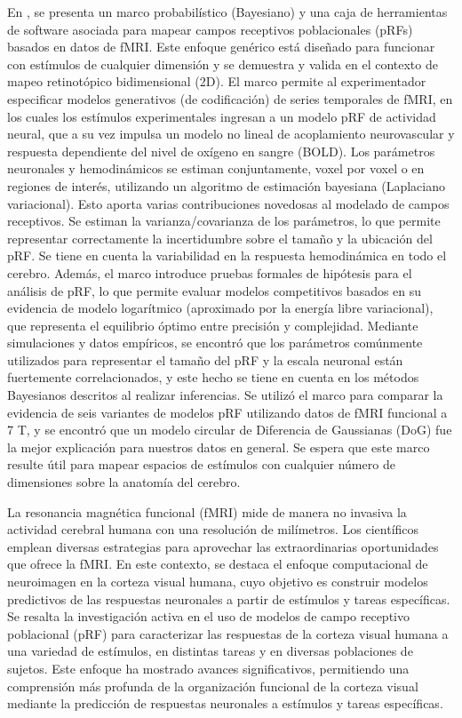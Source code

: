 En \cite{zeidman_bayesian_2018}, se presenta un marco probabilístico (Bayesiano) y una caja de herramientas de software asociada para mapear campos receptivos poblacionales (pRFs) basados en datos de fMRI. Este enfoque genérico está diseñado para funcionar con estímulos de cualquier dimensión y se demuestra y valida en el contexto de mapeo retinotópico bidimensional (2D). El marco permite al experimentador especificar modelos generativos (de codificación) de series temporales de fMRI, en los cuales los estímulos experimentales ingresan a un modelo pRF de actividad neural, que a su vez impulsa un modelo no lineal de acoplamiento neurovascular y respuesta dependiente del nivel de oxígeno en sangre (BOLD). Los parámetros neuronales y hemodinámicos se estiman conjuntamente, voxel por voxel o en regiones de interés, utilizando un algoritmo de estimación bayesiana (Laplaciano variacional). Esto aporta varias contribuciones novedosas al modelado de campos receptivos. Se estiman la varianza/covarianza de los parámetros, lo que permite representar correctamente la incertidumbre sobre el tamaño y la ubicación del pRF. Se tiene en cuenta la variabilidad en la respuesta hemodinámica en todo el cerebro. Además, el marco introduce pruebas formales de hipótesis para el análisis de pRF, lo que permite evaluar modelos competitivos basados en su evidencia de modelo logarítmico (aproximado por la energía libre variacional), que representa el equilibrio óptimo entre precisión y complejidad. Mediante simulaciones y datos empíricos, se encontró que los parámetros comúnmente utilizados para representar el tamaño del pRF y la escala neuronal están fuertemente correlacionados, y este hecho se tiene en cuenta en los métodos Bayesianos descritos al realizar inferencias. Se utilizó el marco para comparar la evidencia de seis variantes de modelos pRF utilizando datos de fMRI funcional a 7 T, y se encontró que un modelo circular de Diferencia de Gaussianas (DoG) fue la mejor explicación para nuestros datos en general. Se espera que este marco resulte útil para mapear espacios de estímulos con cualquier número de dimensiones sobre la anatomía del cerebro.

La resonancia magnética funcional (fMRI) mide de manera no invasiva la actividad cerebral humana con una resolución de milímetros. Los científicos emplean diversas estrategias para aprovechar las extraordinarias oportunidades que ofrece la fMRI. En este contexto, se destaca el enfoque computacional de neuroimagen en la corteza visual humana, cuyo objetivo es construir modelos predictivos de las respuestas neuronales a partir de estímulos y tareas específicas. Se resalta la investigación activa en el uso de modelos de campo receptivo poblacional (pRF) para caracterizar las respuestas de la corteza visual humana a una variedad de estímulos, en distintas tareas y en diversas poblaciones de sujetos. Este enfoque ha mostrado avances significativos, permitiendo una comprensión más profunda de la organización funcional de la corteza visual mediante la predicción de respuestas neuronales a estímulos y tareas específicas.\cite{wandell_computational_2015}

